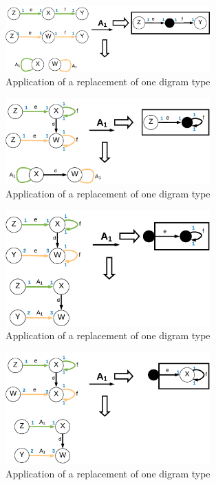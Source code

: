\documentclass[a4paper]{scrartcl}
\begin{document}
\begin{figure}[h]
	\centering
	\includegraphics[width=0.7\textwidth]{img/type5}
	\caption{Application of a replacement of one digram type}
	\label{fig:type5}
\end{figure}

\begin{figure}[h]
	\centering
	\includegraphics[width=0.7\textwidth]{img/type6}
	\caption{Application of a replacement of one digram type}
	\label{fig:type6}
\end{figure}


\begin{figure}[h]
	\centering
	\includegraphics[width=0.7\textwidth]{img/type7}
	\caption{Application of a replacement of one digram type}
	\label{fig:type7}
\end{figure}

\begin{figure}[h]
	\centering
	\includegraphics[width=0.7\textwidth]{img/type8}
	\caption{Application of a replacement of one digram type}
	\label{fig:type8}
\end{figure}
\end{document}

